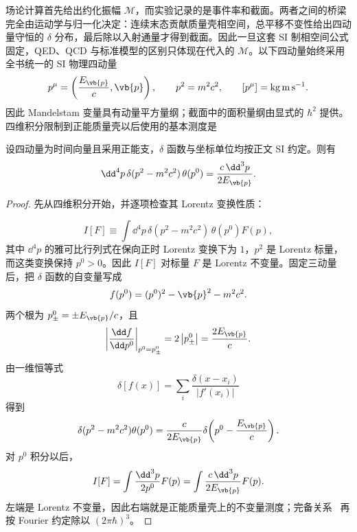 
场论计算首先给出约化振幅 $\mathcal M$，而实验记录的是事件率和截面。两者之间的桥梁完全由运动学与归一化决定：连续末态贡献质量壳相空间，总平移不变性给出四动量守恒的 $\delta$ 分布，最后除以入射通量才得到截面。因此一旦这套 SI 制相空间公式固定，QED、QCD 与标准模型的区别只体现在代入的 $\mathcal M$。以下四动量始终采用全书统一的 SI 物理四动量
\begin{equation}
 p^\mu=\left(\frac{E_{\vb{p}}}{c},\vb{p}\right),
 \qquad
 p^2=m^2c^2,
 \qquad
 [p^\mu]=\mathrm{kg\,m\,s^{-1}}.
 \label{eq:si-scattering-fourmomentum-r9}
\end{equation}
因此 Mandelstam 变量具有动量平方量纲；截面中的面积量纲由显式的 \(\hbar^2\) 提供。四维积分限制到正能质量壳以后使用的基本测度是


\begin{proposition}[正能质量壳测度的积分化简]
设四动量为时间向量且采用正能支，$\delta$ 函数与坐标单位均按正文 SI 约定。则有
\begin{equation}
 {
 \dd^4 p\,\delta(p^2-m^2c^2)\,\theta(p^0)
 =\frac{c\,\dd^3 p}{2E_{\vb{p}}}.}
\label{eq:positive-energy-mass-shell-measure-r68}
\end{equation}
\end{proposition}
\begin{proof}
先从四维积分开始，并逐项检查其 Lorentz 变换性质：

\begin{equation*}
 I[F]\equiv
 \int\dd^4 p\,
 \delta(p^2-m^2c^2)\,\theta(p^0)F(p),
 \end{equation*}
其中 $\dd^4 p$ 的雅可比行列式在保向正时 Lorentz 变换下为 $1$，$p^2$ 是 Lorentz 标量，而这类变换保持 $p^0>0$。因此 $I[F]$ 对标量 $F$ 是 Lorentz 不变量。固定三动量后，把 $\delta$ 函数的自变量写成
\begin{equation*}
 f(p^0)=(p^0)^2-\vb{p}^2-m^2c^2.
\end{equation*}
两个根为 $p^0_\pm=\pm E_{\vb{p}}/c$，且
\begin{equation*}
 \left|\frac{\dd f}{\dd p^0}\right|_{p^0=p^0_\pm}
 =2\left|p^0_\pm\right|
 =\frac{2E_{\vb{p}}}{c}.
\end{equation*}
由一维恒等式
\begin{equation*}
 \delta[f(x)]
 =\sum_i\frac{\delta(x-x_i)}{|f'(x_i)|}
\end{equation*}
得到
\begin{equation*}
 \delta(p^2-m^2c^2)\theta(p^0)
 =\frac{c}{2E_{\vb{p}}}
 \delta\!\left(p^0-\frac{E_{\vb{p}}}{c}\right).
\end{equation*}
对 $p^0$ 积分以后，
\begin{equation*}
 I[F]
 =\int\frac{\dd^3 p}{2p^0}F(p)
 =\int\frac{c\,\dd^3 p}{2E_{\vb{p}}}F(p).
 \end{equation*}
左端是 Lorentz 不变量，因此右端就是正能质量壳上的不变量测度；完备关系~ 再按 Fourier 约定除以 $(2\pi\hbar)^3$。
\end{proof}


